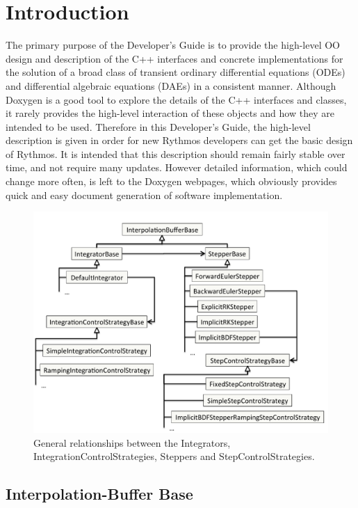 
\section{Introduction}

The primary purpose of the Developer's Guide is to provide the high-level
OO design and description of the C++ interfaces and concrete implementations
for the solution of a broad class of transient ordinary differential
equations (ODEs) and differential algebraic equations (DAEs) in a
consistent manner. Although Doxygen is a good tool to explore the
details of the C++ interfaces and classes, it rarely provides the
high-level interaction of these objects and how they are intended
to be used. Therefore in this Developer's Guide, the high-level description
is given in order for new Rythmos developers can get the basic design
of Rythmos. It is intended that this description should remain fairly
stable over time, and not require many updates. However detailed information,
which could change more often, is left to the Doxygen webpages, which
obviously provides quick and easy document generation of software
implementation.

\begin{figure}
\centering{}\includegraphics[width=5in]{figures/IntegratorStepperDesign}\caption{General relationships between the Integrators, IntegrationControlStrategies,
Steppers and StepControlStrategies.\label{rythmos:fig:IntegratorStepperDesign}}
\end{figure}



\subsection{Interpolation-Buffer Base\label{rythmos:sec:InterpolationBufferBase}}

